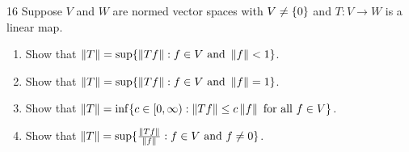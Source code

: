 \begin{exercise}{16}
Suppose $V$ and $W$ are normed vector spaces with $V \neq \{0\}$ and $T: V \to W$ is a linear map.
\begin{enumerate}
    \item Show that $\left\lVert T\right\rVert = \sup \{\left\lVert Tf\right\rVert: f \in V \text{ and } \left\lVert f\right\rVert < 1\}$.
    \item Show that $\left\lVert T\right\rVert = \sup \{\left\lVert Tf\right\rVert: f \in V \text{ and } \left\lVert f\right\rVert = 1\}$.
    \item Show that $\left\lVert T\right\rVert = \inf \{c \in [0, \infty): \left\lVert Tf\right\rVert \leq c\left\lVert f\right\rVert \text{ for all } f \in V\}$.
    \item Show that $\left\lVert T\right\rVert = \sup \{\frac{\left\lVert Tf\right\rVert}{\left\lVert f\right\rVert}: f \in V \text{ and } f \neq 0\}$.
\end{enumerate}
\end{exercise}
